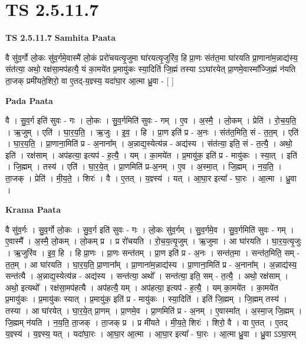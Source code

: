 \documentclass[17pt]{extarticle}
\begin{document}
\section{ TS 2.5.11.7 }

\textbf{TS 2.5.11.7 } \newline
\textbf{Samhita Paata} \newline

वै सु॑व॒र्गो लो॒कः सु॑व॒र्गमे॒वास्मै॑ लो॒कं प्ररो॑चयत्यृ॒जुमा घा॑रयत्यृ॒जुरि॑व॒ हि प्रा॒णः संत॑त॒मा घा॑रयति प्रा॒णाना॑म॒न्नाद्य॑स्य॒ संत॑त्या॒ अथो॒ रक्ष॑सा॒मप॑हत्यै॒ यं का॒मये॑त प्र॒मायु॑कः स्या॒दिति॑ जि॒ह्मं तस्या ऽऽघा॑रयेत् प्रा॒णमे॒वास्मा᳚ज्जि॒ह्मं न॑यति ता॒जक् प्रमी॑यते॒शिरो॒ वा ए॒तद्-य॒ज्ञ्स्य॒ यदा॑घा॒र आ॒त्मा ध्रु॒वा - [  ] \newline

\textbf{Pada Paata} \newline

वै । सु॒व॒र्ग इति॑ सुवः - गः । लो॒कः । सु॒व॒र्गमिति॑ सुवः - गम् । ए॒व । अ॒स्मै॒ । लो॒कम् । प्रेति॑ । रो॒च॒य॒ति॒ । ऋ॒जुम् । एति॑ । घा॒र॒य॒ति॒ । ऋ॒जुः । इ॒व॒ । हि । प्रा॒ण इति॑ प्र - अ॒नः । संत॑त॒मिति॒ सं - त॒त॒म् । एति॑ । घा॒र॒य॒ति॒ । प्रा॒णाना॒मिति॑ प्र - अ॒नाना᳚म् । अ॒न्नाद्य॒स्येत्य॑न्न - अद्य॑स्य । संत॑त्या॒ इति॒ सं - त॒त्यै॒ । अथो॒ इति॑ । रक्ष॑साम् । अप॑हत्या॒ इत्यप॑ - ह॒त्यै॒ । यम् । का॒मये॑त । प्र॒मायु॑क॒ इति॑ प्र - मायु॑कः । स्या॒त् । इति॑ । जि॒ह्मम् । तस्य॑ । एति॑ । घा॒र॒ये॒त् । प्रा॒णमिति॑ प्र-अ॒नम् । ए॒व । अ॒स्मा॒त् । जि॒ह्मम् । न॒य॒ति॒ । ता॒जक् । प्रेति॑ । मी॒य॒ते॒ । शिरः॑ । वै । ए॒तत् । य॒ज्ञ्स्य॑ । यत् । आ॒घा॒र इत्या᳚ - घा॒रः । आ॒त्मा । ध्रु॒वा ।  \newline


\textbf{Krama Paata} \newline

वै सु॑व॒र्गः । सु॒व॒र्गो लो॒कः । सु॒व॒र्ग इति॑ सुवः - गः । लो॒कः सु॑व॒र्गम् । सु॒व॒र्गमे॒व । सु॒व॒र्गमिति॑ सुवः - गम् । ए॒वास्मै᳚ । अ॒स्मै॒ लो॒कम् । लो॒कम् प्र । प्र रो॑चयति । रो॒च॒य॒त्यृ॒जुम् । ऋ॒जुमा । आ घा॑रयति । घा॒र॒य॒त्यृ॒जुः । ऋ॒जुरि॑व । इ॒व॒ हि । हि प्रा॒णः । प्रा॒णः सन्त॑तम् । प्रा॒ण इति॑ प्र - अ॒नः । सन्त॑त॒मा । सन्त॑त॒मिति॒ सम् - त॒त॒म् । आ घा॑रयति । घा॒र॒य॒ति॒ प्रा॒णाना᳚म् । प्रा॒णाना॑म॒न्नाद्य॑स्य । प्रा॒णाना॒मिति॑ प्र - अ॒नाना᳚म् । अ॒न्नाद्य॑स्य॒ सन्त॑त्यै । अ॒न्नाद्य॒स्येत्य॑न्न - अद्य॑स्य । सन्त॑त्या॒ अथो᳚ । सन्त॑त्या॒ इति॒ सम् - त॒त्यै॒ । अथो॒ रक्ष॑साम् । अथो॒ इत्यथो᳚ । रक्ष॑सा॒मप॑हत्यै । अप॑हत्यै॒ यम् । अप॑हत्या॒ इत्यप॑ - ह॒त्यै॒ । यम् का॒मये॑त । का॒मये॑त प्र॒मायु॑कः । प्र॒मायु॑कः स्यात् । प्र॒मायु॑क॒ इति॑ प्र - मायु॑कः । स्या॒दिति॑ । इति॑ जि॒ह्मम् । जि॒ह्मम् तस्य॑ । तस्या । आ घा॑रयेत् । घा॒र॒ये॒त् प्रा॒णम् । प्रा॒णमे॒व । प्रा॒णमिति॑ प्र - अ॒नम् । ए॒वास्मा᳚त् । अ॒स्मा॒ज् जि॒ह्मम् । जि॒ह्मम् न॑यति । न॒य॒ति॒ ता॒जक् । ता॒जक् प्र । प्र मी॑यते । मी॒य॒ते॒ शिरः॑ । शिरो॒ वै । वा ए॒तत् । ए॒तद् य॒ज्ञ्स्य॑ । य॒ज्ञ्स्य॒ यत् । यदा॑घा॒रः । आ॒घा॒र आ॒त्मा । आ॒घा॒र इत्या᳚ - घा॒रः । आ॒त्मा ध्रु॒वा । ध्रु॒वा ऽऽघा॒रम् \newline
\end{document}
